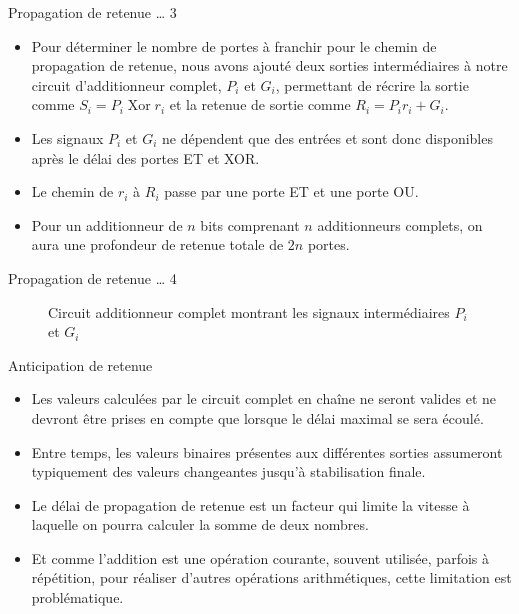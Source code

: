 \documentclass[presentation]{beamer}
\begin{document}
\begin{frame}[label={sec:orgd2dedb3}]{Propagation de retenue \ldots{} 3}
\begin{itemize}
\item Pour déterminer le nombre de portes à franchir pour le chemin de propagation de retenue, nous avons ajouté deux sorties intermédiaires à notre circuit d'additionneur complet, \(P_i\) et \(G_i\), permettant de récrire la sortie comme \(S_i = P_i \operatorname{Xor} r_i\) et la retenue de sortie comme \(R_i = P_i r_i + G_i\).

\item Les signaux \(P_i\) et \(G_i\) ne dépendent que des entrées et sont donc disponibles après le délai des portes ET et XOR.

\item Le chemin de \(r_i\) à \(R_i\) passe par une porte ET et une porte OU.

\item Pour un additionneur de \(n\) bits comprenant \(n\) additionneurs complets, on aura une profondeur de retenue totale de \(2n\) portes.
\end{itemize}
\end{frame}

\begin{frame}[label={sec:orga175843}]{Propagation de retenue \ldots{} 4}
\begin{figure}[htbp]
\centering

\caption{\label{fig:org9220dbf}Circuit additionneur complet montrant les signaux intermédiaires \(P_i\) et \(G_i\)}
\end{figure}
\end{frame}

\begin{frame}[label={sec:orgf1beb96}]{Anticipation de retenue}
\begin{itemize}
\item Les valeurs calculées par le circuit complet en chaîne ne seront valides et ne devront être prises en compte que lorsque le délai maximal se sera écoulé.

\item Entre temps, les valeurs binaires présentes aux différentes sorties assumeront typiquement des valeurs changeantes jusqu'à stabilisation finale.

\item Le délai de propagation de retenue est un facteur qui limite la vitesse à laquelle on pourra calculer la somme de deux nombres.

\item Et comme l'addition est une opération courante, souvent utilisée, parfois à répétition, pour réaliser d'autres opérations arithmétiques, cette limitation est problématique.
\end{itemize}
\end{frame}
\end{document}
